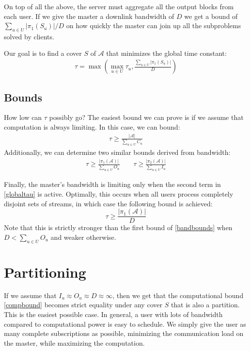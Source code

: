 \documentclass[12pt]{article}
\begin{document}
On top of all the above, the server must aggregate all the output blocks from each user.
If we give the master a downlink bandwidth of $D$ we get a bound of $\sum_{u \in U} |\pi_1(S_u)| / D$ on how quickly the master can join up all the subproblems solved by clients.

Our goal is to find a cover $S$ of $\mathcal{A}$ that minimizes the global time constant:
\begin{align}
\tau = \max \left( \max_{u \in U} \tau_u, \frac{\sum_{u \in U} |\pi_1(S_u)|}{D} \right)\label{globaltau}
\end{align}

\subsection{Bounds}
How low can $\tau$ possibly go?
The easiest bound we can prove is if we assume that computation is always limiting.
In this case, we can bound:
\begin{align}
\tau \ge \frac{|\mathcal{A}|}{\sum_{u \in U} C_u}\label{compbound}
\end{align}
Additionally, we can determine two similar bounds derived from bandwidth:
\begin{align}
\tau \ge \frac{|\pi_1(\mathcal{A})|}{\sum_{u \in U} O_u} \qquad \tau \ge \frac{|\pi_2(\mathcal{A})|}{\sum_{u \in U} I_u}\label{bandbounds}
\end{align}

Finally, the master's bandwidth is limiting only when the second term in \eqref{globaltau} is active.
Optimally, this occurs when all users process completely disjoint sets of streams, in which case the following bound is achieved:
\[ \tau \ge \frac{|\pi_1(\mathcal{A})|}{D} \]
Note that this is strictly stronger than the first bound of \eqref{bandbounds} when $D < \sum_{u \in U} O_u$ and weaker otherwise.

\section{Partitioning}
If we assume that $I_u \approx O_u \approx D \approx \infty$, then we get that the computational bound \eqref{compbound} becomes strict equality under any cover $S$ that is also a partition.
This is the easiest possible case.
In general, a user with lots of bandwidth compared to computational power is easy to schedule.
We simply give the user as many complete subscriptions as possible, minimizing the communication load on the master, while maximizing the computation.
\end{document}
